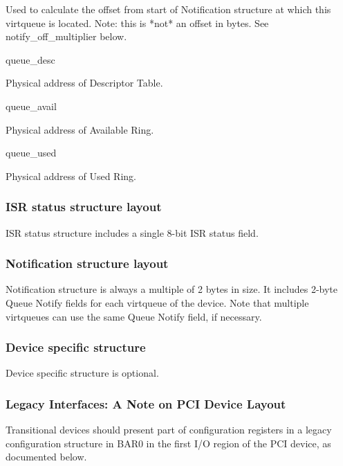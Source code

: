         Used to calculate the offset from start of Notification structure at
        which this virtqueue is located.
        Note: this is *not* an offset in bytes. See notify_off_multiplier below.

queue_desc

        Physical address of Descriptor Table.

queue_avail

        Physical address of Available Ring.

queue_used

        Physical address of Used Ring.

\subsubsection{ISR status structure layout}\label{sec:Virtio Transport Options / Virtio Over PCI Bus / PCI Device Layout / ISR status structure layout}
ISR status structure includes a single 8-bit ISR status field.

\subsubsection{Notification structure layout}\label{sec:Virtio Transport Options / Virtio Over PCI Bus / PCI Device Layout / Notification structure layout}
Notification structure is always a multiple of 2 bytes in size.
It includes 2-byte Queue Notify fields for each virtqueue of
the device. Note that multiple virtqueues can use the same
Queue Notify field, if necessary.

\subsubsection{Device specific structure}\label{sec:Virtio Transport Options / Virtio Over PCI Bus / PCI Device Layout / Device specific structure}

Device specific structure is optional.

\subsubsection{Legacy Interfaces: A Note on PCI Device Layout}\label{sec:Virtio Transport Options / Virtio Over PCI Bus / PCI Device Layout / Legacy Interfaces: A Note on PCI Device Layout}

Transitional devices should present part of configuration
registers in a legacy configuration structure in BAR0 in the first I/O
region of the PCI device, as documented below.

